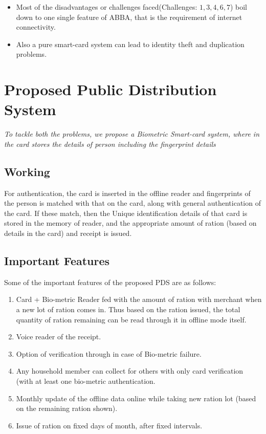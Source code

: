 \documentclass[12pt]{article}
\begin{document}
\begin{itemize}
    \item Most of the disadvantages or challenges faced(Challenges: $ 1, 3, 4, 6, 7 $)  boil down to one single feature of ABBA, that is the requirement of internet connectivity.
    
    \item Also a pure smart-card system can lead to identity theft and duplication problems.
\end{itemize}

\pagebreak

\section{Proposed Public Distribution System}


\bigskip

{\large \textit{To tackle both the problems, we propose a Biometric Smart-card system, where in the card stores the details of person including the fingerprint details}
}
\subsection{Working}

For authentication, the card is inserted in the offline reader and fingerprints of the person is matched with that on the card, along with general authentication of the card. If these match, then the Unique identification details of that card is stored in the memory of reader, and the appropriate amount of ration (based on details in the card) and receipt is issued. 


\subsection{Important Features}

Some of the important features of the proposed PDS are as follows:


\begin{enumerate}
    \item   Card + Bio-metric Reader fed with the amount of ration with merchant when a new lot of ration comes in. Thus based on the ration issued, the total quantity of ration remaining can be read through it in offline mode itself.
    \item   Voice reader of the receipt.
    \item   Option of verification through in case of Bio-metric failure.
    \item   Any household member can collect for others with only card verification (with at least one bio-metric authentication.
    \item   Monthly update of the offline data online while taking new ration lot (based on the remaining ration shown).
    \item Issue of ration on fixed days of month, after fixed intervals. 
\end{enumerate}
\end{document}
